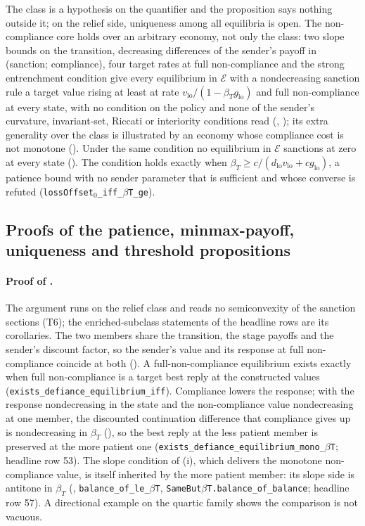 The class is a hypothesis on the quantifier and the proposition says nothing
outside it; on the relief side, uniqueness among all equilibria is open.
The non-compliance core holds over an arbitrary economy, not only the class:
two slope bounds on the transition, decreasing differences of the sender's payoff in
(sanction; compliance), four target rates at full non-compliance and the strong entrenchment
condition give every equilibrium in $\mathcal E$ with a nondecreasing sanction rule a
target value rising at least at rate $v_{\mathrm{lo}}/(1-\beta_Tg_{\mathrm{lo}})$ and
full non-compliance at every state, with no condition on the policy and none of the
sender's curvature, invariant-set, Riccati or interiority conditions read
(, ); its
extra generality over the class is illustrated by an economy whose compliance
cost is not monotone (). Under the same condition no
equilibrium in $\mathcal E$ sanctions at zero at every state
(). The condition holds exactly when
$\beta_T\ge c/(d_{\mathrm{lo}}v_{\mathrm{lo}}+cg_{\mathrm{lo}})$, a patience bound with
no sender parameter that is sufficient and whose converse is refuted
(\texttt{lossOffset$_0$\_iff\_$\beta$T\_ge}).

\subsection{Proofs of the patience, minmax-payoff, uniqueness and threshold propositions}
\label{app:proofs:scope}

\paragraph{Proof of .}
The argument runs on the relief class and reads no semiconvexity of the
sanction sections \textup{(T6)}; the enriched-subclass statements of the
headline rows are its corollaries. The two members share the transition, the
stage payoffs and the sender's discount factor, so the sender's value and its
response at full non-compliance
coincide at both (). A full-non-compliance
equilibrium exists exactly when full non-compliance is a target best reply at the
constructed values (\texttt{exists\_defiance\_equilibrium\_iff}). Compliance
lowers the response; with the response nondecreasing in the state and the
non-compliance value nondecreasing at one member, the discounted continuation
difference that compliance gives up is nondecreasing in $\beta_T$
(), so the best reply at the less
patient member is preserved at the more patient one
(\texttt{exists\_defiance\_equilibrium\_mono\_$\beta$T}; headline row 53). The
slope condition of (i), which delivers the monotone
non-compliance value, is itself inherited by the more patient member: its slope side
is antitone in $\beta_T$ (,
\texttt{balance\_of\_le\_$\beta$T}, \texttt{SameBut$\beta$T.balance\_of\_balance};
headline row 57). A directional example on the quartic family shows the
comparison is not vacuous.

